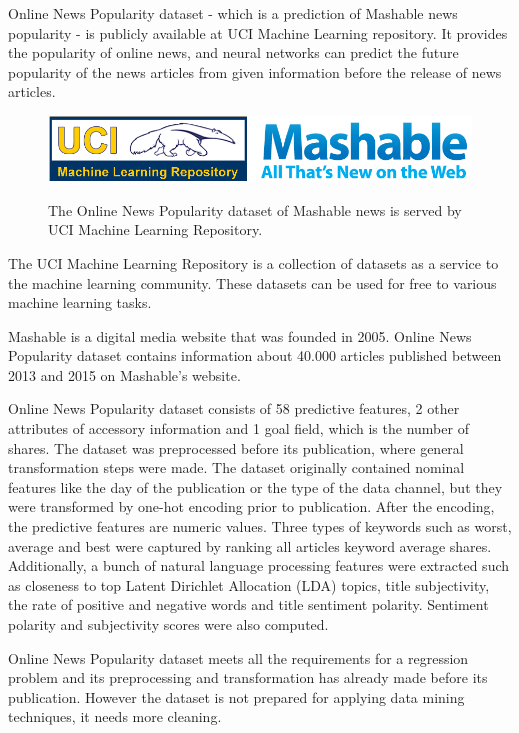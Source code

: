 Online News Popularity dataset \cite{Fernandes2015API, onlinenews-url} - which is a prediction of Mashable news popularity - is publicly available at UCI Machine Learning repository. It provides the popularity of online news, and neural networks can predict the future popularity of the news articles from given information before the release of news articles. 

\begin{figure}[h]
	\centering
	\caption{The Online News Popularity dataset of Mashable news is served by UCI Machine Learning Repository.}
	\includegraphics[height=0.15\linewidth]{./figures/mashable}
	\label{fig:mashable}
\end{figure}

The UCI Machine Learning Repository \cite{uci-url} is a collection of datasets as a service to the machine learning community. These datasets can be used for free to various machine learning tasks.\smallskip

Mashable is a digital media website that was founded in 2005. Online News Popularity dataset \cite{Ren2015PredictingAE} contains information about 40.000 articles published between 2013 and 2015 on Mashable's website. \smallskip

Online News Popularity dataset consists of 58 predictive features, 2 other attributes of accessory information and 1 goal field, which is the number of shares. The dataset was preprocessed before its publication, where general transformation steps were made. The dataset originally contained nominal features like the day of the publication or the type of the data channel, but they were transformed by one-hot encoding prior to publication. After the encoding, the predictive features are numeric values. Three types of keywords such as worst, average and best were captured by ranking all articles keyword average shares. Additionally, a bunch of natural language processing features were extracted such as closeness to top Latent Dirichlet Allocation (LDA) topics, title subjectivity, the rate of positive and negative words and title sentiment polarity. Sentiment polarity and subjectivity scores were also computed.\smallskip

Online News Popularity dataset meets all the requirements for a regression problem and its preprocessing and transformation has already made before its publication. However the dataset is not prepared for applying data mining techniques, it needs more cleaning.



